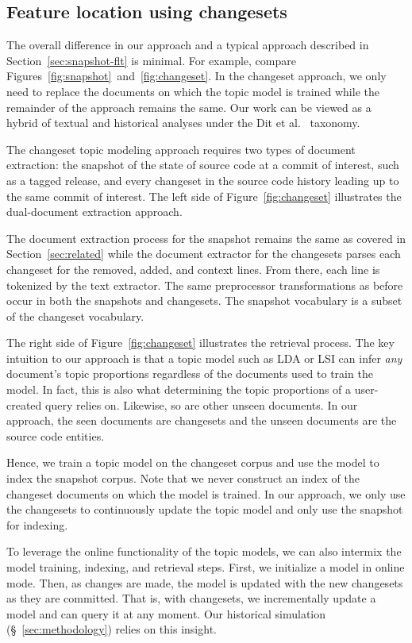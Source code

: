 \subsection{Feature location using changesets}

The overall difference in our approach and a typical approach described in Section~\ref{sec:snapshot-flt} is minimal.
For example, compare Figures~\ref{fig:snapshot}~and~\ref{fig:changeset}.
In the changeset approach, we only need to replace the documents on which the topic model is trained
while the remainder of the approach remains the same.
Our work can be viewed as a hybrid of textual and historical analyses
under the Dit et al.~\cite{Dit-etal:2011} taxonomy.


The changeset topic modeling approach requires two types of document extraction:
the snapshot of the state of source code at a commit of interest, such as
a tagged release, and every changeset in the source code history leading up to
the same commit of interest.  The left side of Figure~\ref{fig:changeset}
illustrates the dual-document extraction approach.

The document extraction process for the snapshot remains the same as covered in
Section~\ref{sec:related} while the document extractor for the changesets parses
each changeset for the removed, added, and context lines.  From there, each line
is tokenized by the text extractor.  The same preprocessor transformations as
before occur in both the snapshots and changesets.  The snapshot vocabulary is
a subset of the changeset vocabulary.

The right side of Figure~\ref{fig:changeset} illustrates the retrieval process.
The key intuition to our approach is that a topic model such as LDA or LSI can
infer \emph{any} document's topic proportions regardless of the documents used
to train the model.  In fact, this is also what determining the topic
proportions of a user-created query relies on. Likewise, so are other unseen
documents. In our approach, the seen documents are changesets and the unseen
documents are the source code entities.

Hence, we train a topic model on the changeset corpus and use the model to index
the snapshot corpus.  Note that we never construct an index of the changeset
documents on which the model is trained.  In our approach, we only use the
changesets to continuously update the topic model and only use the snapshot for
indexing.

To leverage the online functionality of the topic models, we can also intermix
the model training, indexing, and retrieval steps.  First, we initialize a model
in online mode.  Then, as changes are made, the model is updated with the new
changesets as they are committed.  That is, with changesets, we incrementally
update a model and can query it at any moment.  Our historical simulation
(\S~\ref{sec:methodology}) relies on this insight.

